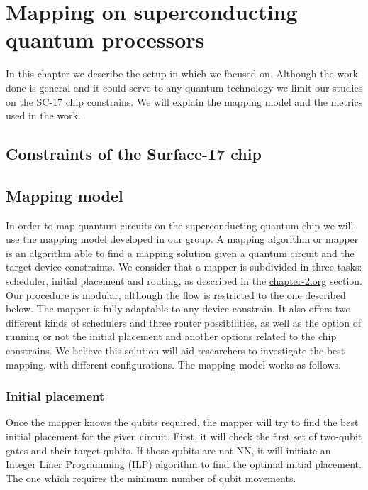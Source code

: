 

\chapter{Mapping on superconducting quantum processors}
\label{sec:orgc4c9950}

In this chapter we describe the setup in which we focused on.
Although the work done is general and it could serve to any quantum technology we limit our studies on the SC-17 chip constrains.
We will explain the mapping model and the metrics used in the work.

\section{Constraints of the Surface-17 chip}
\label{sec:org419fab2}


\section{Mapping model}
\label{sec:org366646a}
In order to map quantum circuits on the superconducting quantum chip we will use the mapping model developed in our group.
A mapping algorithm or mapper is an algorithm able to find a mapping solution given a quantum circuit and the target device constraints.
We consider that a mapper is subdivided in three tasks: scheduler, initial placement and routing, as described in the \url{chapter-2.org} section.
Our procedure is modular, although the flow is restricted to the one described below.
The mapper is fully adaptable to any device constrain.
It also offers two different kinds of schedulers and three router possibilities, as well as the option of running or not the initial placement and another options related to the chip constrains.
We believe this solution will aid researchers to investigate the best mapping, with different configurations.
The mapping model works as follows.

\subsection{Initial placement}
\label{sec:org965365e}

Once the mapper knows the qubits required, the mapper will try to find the best initial placement for the given circuit.
First, it will check the first set of two-qubit gates and their target qubits.
If those qubits are not NN, it will initiate an Integer Liner Programming (ILP) algorithm \cite{Lao_2018} to find the optimal initial placement.
The one which requires the minimum number of qubit movements.


